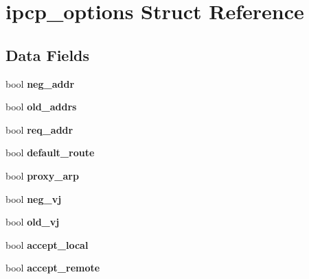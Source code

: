 \hypertarget{structipcp__options}{}\section{ipcp\+\_\+options Struct Reference}
\label{structipcp__options}
\subsection*{Data Fields}
\begin{DoxyCompactItemize}
\item 
\mbox{\label{structipcp__options_ad6cd1fe7c03bd0a29b555a075b683cc7}} 
bool {\bfseries neg\+\_\+addr}
\item 
\mbox{\label{structipcp__options_a54e1ddb0af97d08330d282ce0e368b14}} 
bool {\bfseries old\+\_\+addrs}
\item 
\mbox{\label{structipcp__options_aba4a7d63c2e1a9242b2d9bf0c71d41ad}} 
bool {\bfseries req\+\_\+addr}
\item 
\mbox{\label{structipcp__options_a526dc0e23fb8c83ba7f855bd26462e77}} 
bool {\bfseries default\+\_\+route}
\item 
\mbox{\label{structipcp__options_a24d18e9a9f570837d9b575257646c37e}} 
bool {\bfseries proxy\+\_\+arp}
\item 
\mbox{\label{structipcp__options_a69ce52c8bb012d50abb92de7d3246bfd}} 
bool {\bfseries neg\+\_\+vj}
\item 
\mbox{\label{structipcp__options_a48f1d44e7738cab51646c873cfddcac6}} 
bool {\bfseries old\+\_\+vj}
\item 
\mbox{\label{structipcp__options_a4a2d270940f96fbfb6c7b8525bcd5ecc}} 
bool {\bfseries accept\+\_\+local}
\item 
\mbox{\label{structipcp__options_a6313b3607343e880380cde572bfea4a6}} 
bool {\bfseries accept\+\_\+remote}
\item 
\mbox{\label{structipcp__options_af28b8d2fb2bbfe66cb2f63e4e704e843}} 

\end{DoxyCompactItemize}
